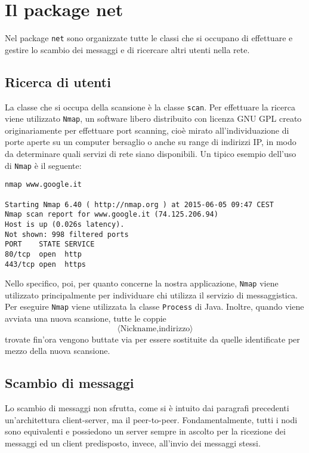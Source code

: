 \section{Il package net}
Nel package \texttt{net} sono organizzate tutte le classi che si occupano di effettuare e gestire lo
scambio dei messaggi e di ricercare altri utenti nella rete.

\subsection{Ricerca di utenti}
La classe che si occupa della scansione è la classe \texttt{scan}. Per effettuare la
ricerca viene utilizzato \texttt{Nmap},  un software libero distribuito con licenza GNU GPL
creato originariamente per effettuare port scanning, cioè mirato all'individuazione di porte aperte
su un computer bersaglio o anche su range di indirizzi IP, in modo da determinare quali
servizi di rete siano disponibili. Un tipico esempio dell'uso di \texttt{Nmap} è il seguente:

\begin{lstlisting}
nmap www.google.it

Starting Nmap 6.40 ( http://nmap.org ) at 2015-06-05 09:47 CEST
Nmap scan report for www.google.it (74.125.206.94)
Host is up (0.026s latency).
Not shown: 998 filtered ports
PORT    STATE SERVICE
80/tcp  open  http
443/tcp open  https
\end{lstlisting}

Nello specifico, poi, per quanto concerne la nostra applicazione, \texttt{Nmap}
viene utilizzato principalmente per individuare chi utilizza il servizio di messaggistica.
Per eseguire \texttt{Nmap} viene utilizzata la classe \texttt{Process} di Java.
Inoltre, quando viene avviata una nuova scansione, tutte le coppie
$$ \langle \text{Nickname,indirizzo} \rangle $$
trovate fin'ora vengono buttate via per essere sostituite da quelle identificate per mezzo
della nuova scansione.

\subsection{Scambio di messaggi}
Lo scambio di messaggi non sfrutta, come si è intuito dai paragrafi precedenti un'architettura
client-server, ma il peer-to-peer. Fondamentalmente, tutti i nodi sono equivalenti e possiedono
un server sempre in ascolto per la ricezione dei messaggi ed un client predisposto, invece, all'invio
dei messaggi stessi.